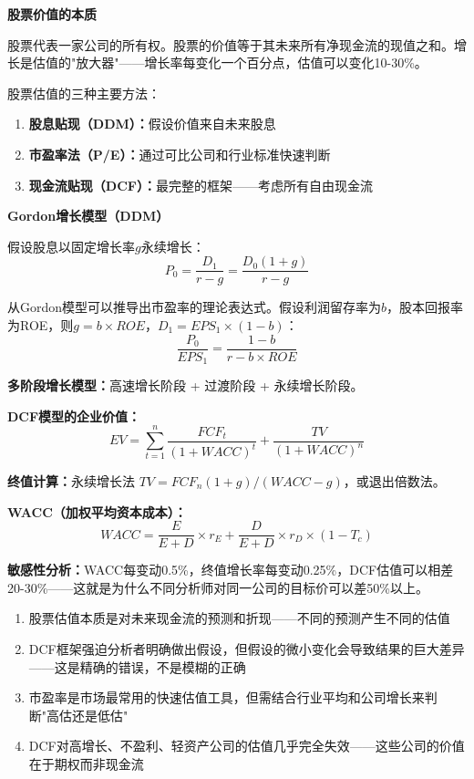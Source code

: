 \documentclass[a4paper,11pt]{ctexbook}
\begin{document}
{\begin{qualitative}
\textbf{股票价值的本质}

股票代表一家公司的所有权。股票的价值等于其未来所有净现金流的现值之和。增长是估值的"放大器"——增长率每变化一个百分点，估值可以变化10-30\%。

股票估值的三种主要方法：
\begin{enumerate}
  \item \textbf{股息贴现（DDM）：}假设价值来自未来股息
  \item \textbf{市盈率法（P/E）：}通过可比公司和行业标准快速判断
  \item \textbf{现金流贴现（DCF）：}最完整的框架——考虑所有自由现金流
\end{enumerate}
\end{qualitative}

\begin{quantitative}
\textbf{Gordon增长模型（DDM）}

假设股息以固定增长率$g$永续增长：
\[
P_0 = \frac{D_1}{r - g} = \frac{D_0(1+g)}{r - g}
\]

从Gordon模型可以推导出市盈率的理论表达式。假设利润留存率为$b$，股本回报率为ROE，则$g = b \times ROE$，$D_1 = EPS_1 \times (1-b)$：
\[
\frac{P_0}{EPS_1} = \frac{1-b}{r - b \times ROE}
\]

\textbf{多阶段增长模型：}高速增长阶段 + 过渡阶段 + 永续增长阶段。

\textbf{DCF模型的企业价值：}
\[
EV = \sum_{t=1}^{n} \frac{FCF_t}{(1+WACC)^t} + \frac{TV}{(1+WACC)^n}
\]

\textbf{终值计算：}永续增长法 $TV = FCF_n(1+g) / (WACC - g)$，或退出倍数法。

\textbf{WACC（加权平均资本成本）：}
\[
WACC = \frac{E}{E+D} \times r_E + \frac{D}{E+D} \times r_D \times (1 - T_c)
\]

\textbf{敏感性分析：}WACC每变动0.5\%，终值增长率每变动0.25\%，DCF估值可以相差20-30\%——这就是为什么不同分析师对同一公司的目标价可以差50\%以上。
\end{quantitative}

\begin{lessonsummary}
\begin{enumerate}
  \item 股票估值本质是对未来现金流的预测和折现——不同的预测产生不同的估值
  \item DCF框架强迫分析者明确做出假设，但假设的微小变化会导致结果的巨大差异——这是精确的错误，不是模糊的正确
  \item 市盈率是市场最常用的快速估值工具，但需结合行业平均和公司增长来判断"高估还是低估"
  \item DCF对高增长、不盈利、轻资产公司的估值几乎完全失效——这些公司的价值在于期权而非现金流
\end{enumerate}
\end{lessonsummary}

}
\end{document}

